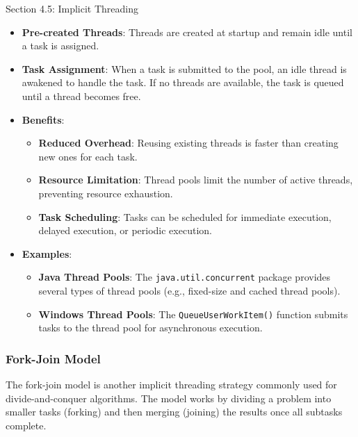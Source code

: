\begin{notes}{Section 4.5: Implicit Threading}
\begin{highlight}
        \begin{itemize}
            \item \textbf{Pre-created Threads}: Threads are created at startup and remain idle until a task is assigned.
            \item \textbf{Task Assignment}: When a task is submitted to the pool, an idle thread is awakened to handle the task. If no threads are available, the task is queued until a thread becomes free.
            \item \textbf{Benefits}:
                \begin{itemize}
                    \item \textbf{Reduced Overhead}: Reusing existing threads is faster than creating new ones for each task.
                    \item \textbf{Resource Limitation}: Thread pools limit the number of active threads, preventing resource exhaustion.
                    \item \textbf{Task Scheduling}: Tasks can be scheduled for immediate execution, delayed execution, or periodic execution.
                \end{itemize}
            \item \textbf{Examples}:
                \begin{itemize}
                    \item \textbf{Java Thread Pools}: The \texttt{java.util.concurrent} package provides several types of thread pools (e.g., fixed-size and cached thread pools).
                    \item \textbf{Windows Thread Pools}: The \texttt{QueueUserWorkItem()} function submits tasks to the thread pool for asynchronous execution.
                \end{itemize}
        \end{itemize}
    
    \end{highlight}
    
    \subsubsection*{Fork-Join Model}
    
    The fork-join model is another implicit threading strategy commonly used for divide-and-conquer algorithms. The model works by dividing a problem into smaller tasks (forking) and then merging 
    (joining) the results once all subtasks complete.
    

\end{notes}
